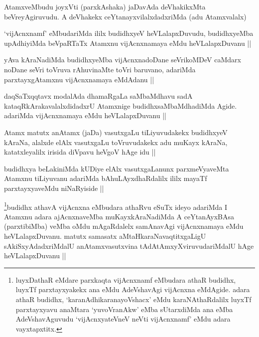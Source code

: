 \begin{artha}
AtamxveMbudu joyxVti (parxkAshaka) jaDavAda deVhakikxMta beVreyAgiruvudu. A deVhakekx ceYtanayxvilalxdadxriMda (adu Atamxvalalx)
\end{artha}

\begin{artha}
`vijAcnxnamf' eMbudariMda ililx budidhxyeV heVLalapxDuvudu, budidhxyeMba upAdhiyiMda beVpaRTaTx Atamxnu vijAcnxnamaya eMdu heVLalapxDuvanu ||
\end{artha}

\begin{artha}
yAva kAraNadiMda budidhxyeMba vijAcnxnadoDane seVrikoMDeV caMdarx noDane seVri toVruva rAhuvinaMte toVri baruvano, adariMda parxtayxgAtamxnu vijAcnxnamaya eMdAdanu ||
\end{artha}

\begin{artha}
daqSaTxqqtavx modalAda dhamaRgaLa saMbaMdhavu sadA kataqRkArakavalalxdidadxrU Atamxnige budidhxsaMbaMdhadiMda Agide. adariMda vijAcnxnamaya eMdu heVLalapxDuvanu ||
\end{artha}

\begin{artha}
Atamx matutx anAtamx (jaDa) vasutxgaLu tiLiyuvudakekx budidhxyeV kAraNa, alalxde elAlx vasutxgaLu toVruvudakekx adu muKayx kAraNa, katatxleyalilx irisida diVpavu heVgoV hAge idu ||
\end{artha}

\begin{artha}
budidhxya beLakiniMda kUDiye elAlx vasutxgaLanunx parxmeVyaveMta Atamxnu tiLiyuvanu adariMda bAhuLAyxdhaRdalilx ililx mayaTf parxtayxyaveMdu niNaRyiside ||
\end{artha}

\begin{artha}
\footnote{luyxDathaR eMdare parxkaqta vijAcnxnamf eMbudara athaR budidhx, luyxTf parxtayxyakekx ana eMdu AdeVshavAgi vijAcnxna eMdAgide. adara athaR budidhx, `karanAdhikaranayoVshacx' eMdu karaNAthaRdalilx luyxTf parxtayxyavu anaMtara `yuvoVranAkw' eMba sUtarxdiMda ana eMba AdeVshavAguvudu `vijAcnxyateV\s neV neVti vijAcnxnamf' eMdu adara vayxtapxtitx.}budidhx athavA vijAcnxna eMbudara athaRvu eSuTx ideyo adariMda I Atamxnu adara ajAcnxnaveMba muKayxkAraNadiMda A ceYtanAyxBAsa (parxtibiMba) veMba oMdu mAgaRdalelx samAnavAgi vijAcnxnamaya eMdu heVLalapxDuvanu. matutx samasatx aMtaHkaraNavaqtitxgaLigU sAkiSxyAdadxriMdalU anAtamxvasutxvina tAdAtAmxyXviruvudariMdalU hAge heVLalapxDuvanu ||
\end{artha}

